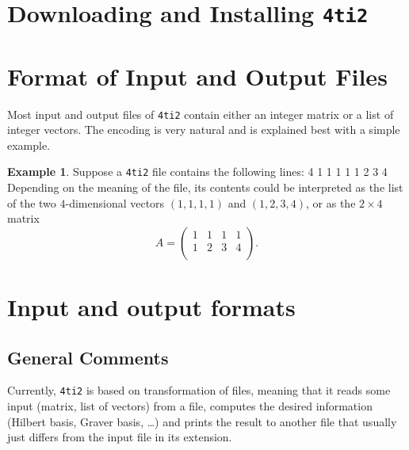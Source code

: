 \documentclass[12pt]{article}
\newenvironment{myverbatim}%
  {\quote\verbatim}%
  {\endverbatim\endquote}
\theoremstyle{definition}
\newtheorem*{Example}{Example}
\newcommand{\FourTiTwo}{{\tt 4ti2}}
\begin{document}
\section{Downloading and Installing \FourTiTwo{}}










\section{Format of Input and Output Files}
\label{Format of Input and Output Files}

Most input and output files of \FourTiTwo{} contain either an 
integer matrix or a list of integer vectors. The encoding is
very natural and is explained best with a simple example.

\begin{Example}
  Suppose a \FourTiTwo{} file contains the following lines:
\begin{myverbatim}
2 4
1 1 1 1
1 2 3 4
\end{myverbatim}
Depending on the meaning of the file, its contents could be
interpreted as the list of the two $4$-dimensional vectors $(1,1,1,1)$
and $(1,2,3,4)$, or as the $2\times 4$ matrix
\[
A=
\begin{pmatrix} 
 1 & 1 & 1 & 1 \\ 
 1 & 2 & 3 & 4 \\ 
\end{pmatrix}.
\]
\end{Example}







\section{Input and output formats}\label{InputOutput}

\subsection{General Comments}
Currently, \FourTiTwo{} is based on transformation of files, meaning
that it reads some input (matrix, list of vectors) from a file,
computes the desired information (Hilbert basis, Graver basis, \ldots)
and prints the result to another file that usually just differs from
the input file in its extension.
\end{document}
